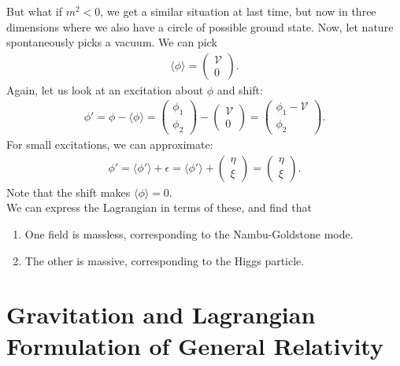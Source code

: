 \documentclass[a4paper,11pt]{article}
\numberwithin{equation}{section}
\theoremstyle{definition}
\begin{document}
But what if $m^2 < 0$, we get a similar situation at last time, but now in three dimensions where we also have a circle of possible ground state. Now, let nature spontaneously picks a vacuum. We can pick
\begin{align}
\langle \phi \rangle = \begin{pmatrix}
\mathcal{V}\\0
\end{pmatrix}.
\end{align}
Again, let us look at an excitation about $\phi$ and shift:
\begin{align}
\phi' = \phi - \langle \phi \rangle = \begin{pmatrix}
\phi_1\\\phi_2
\end{pmatrix} - \begin{pmatrix}
\mathcal{V}\\0
\end{pmatrix} = 
\begin{pmatrix}
\phi_1 - \mathcal{V}\\\phi_2
\end{pmatrix}.
\end{align}
For small excitations, we can approximate:
\begin{align}
\phi' = \langle \phi'\rangle + \epsilon = \langle \phi' \rangle + \begin{pmatrix}
\eta \\ \xi
\end{pmatrix}=
\begin{pmatrix}
\eta \\ \xi
\end{pmatrix}.
\end{align}
Note that the shift makes $\langle \phi \rangle = 0$.\\

We can express the Lagrangian in terms of these, and find that 
\begin{enumerate}
	\item One field is massless, corresponding to the Nambu-Goldstone mode.
	\item The other is massive, corresponding to the Higgs particle. 
\end{enumerate}



\newpage

\section{Gravitation and Lagrangian Formulation of General Relativity}
\end{document}
